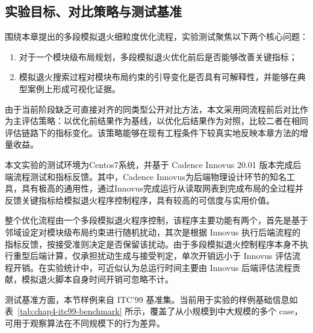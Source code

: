\subsection{实验目标、对比策略与测试基准}
\label{sec:chap4-exp-goal-benchmark}

围绕本章提出的多段模拟退火细粒度优化流程，实验测试聚焦以下两个核心问题：
\begin{enumerate}
    \item 对于一个模块级布局规划，多段模拟退火优化前后是否能够改善关键指标；
    \item 模拟退火搜索过程对模块布局约束的引导变化是否具有可解释性，并能够在典型案例上形成可视化证据。
\end{enumerate}

由于当前阶段缺乏可直接对齐的同类型公开对比方法，本文采用同流程前后对比作为主评估策略：以优化前结果作为基线，以优化后结果作为对照，比较二者在相同评估链路下的指标变化。该策略能够在现有工程条件下较真实地反映本章方法的增量收益。

本文实验的测试环境为Centos7系统，并基于 Cadence Innovus 20.01 版本完成后端流程测试和指标反馈。其中，Cadence Innovus为后端物理设计环节的知名工具，具有极高的通用性，通过Innovus完成运行从读取网表到完成布局的全过程并反馈关键指标给模拟退火程序控制程序，具有较高的可信度与实用价值。

整个优化流程由一个多段模拟退火程序控制，该程序主要功能有两个，首先是基于邻域设定对模块级布局约束进行随机扰动，其次是根据 Innovus 执行后端流程的指标反馈，按接受准则决定是否保留该扰动。由于多段模拟退火控制程序本身不执行重型后端计算，仅承担扰动生成与接受判定，单次开销远小于 Innovus 评估流程开销。在实验统计中，可近似认为总运行时间主要由 Innovus 后端评估流程贡献，模拟退火脚本自身时间开销可忽略不计。


测试基准方面，本节样例来自 ITC'99 基准集。当前用于实验的样例基础信息如表~\ref{tab:chap4-itc99-benchmark} 所示，覆盖了从小规模到中大规模的多个 case，可用于观察算法在不同规模下的行为差异。

